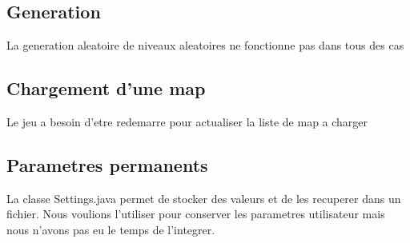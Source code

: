 \documentclass[../main.tex]{subfiles}
\begin{document}
\subsection{Generation}
La generation aleatoire de niveaux aleatoires ne fonctionne pas dans tous des cas

\subsection{Chargement d'une map}
Le jeu a besoin d'etre redemarre pour actualiser la liste de map a charger

\subsection{Parametres permanents}
La classe Settings.java permet de stocker des valeurs et de les recuperer dans un fichier. Nous voulions l'utiliser pour conserver les parametres utilisateur mais nous n'avons pas eu le temps de l'integrer.
\end{document}
